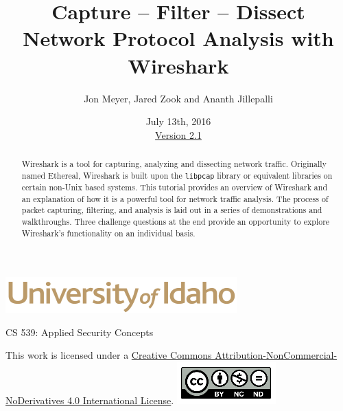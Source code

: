 \documentclass[12pt]{extarticle}
\begin{document}
\title{ Capture -- Filter -- Dissect \\ \large Network Protocol Analysis with Wireshark}
\author{Jon Meyer, Jared Zook and Ananth Jillepalli}
\date{July 13th, 2016 \\ \hyperref[changelog]{Version 2.1}}
\renewcommand{\abstractname}{Summary}
\begin{titlepage}
\maketitle
{}
\begin{center}
\includegraphics[scale=.5]{UofI}

\large{CS 539: Applied Security Concepts}

\vskip 40pt

\end{center}
\begin{abstract}
Wireshark is a tool for capturing, analyzing and dissecting network traffic. Originally named Ethereal, Wireshark is built upon the \texttt{libpcap} library or equivalent libraries on certain non-Unix based systems. This tutorial provides an overview of Wireshark and an explanation of how it is a powerful tool for network traffic analysis. The process of packet capturing, filtering, and analysis is laid out in a series of demonstrations and walkthroughs. Three challenge questions at the end provide an opportunity to explore Wireshark's functionality on an individual basis.
\end{abstract}


\vfill
\begin{center}
This work is licensed under a \href{https://creativecommons.org/licenses/by-nc-nd/2.0/}{Creative Commons Attribution-NonCommercial-NoDerivatives 4.0 International License}.
\vskip 10pt
\includegraphics[scale=.5]{cc}
\end{center}

\end{titlepage}


\pagebreak
\tableofcontents
\end{document}
